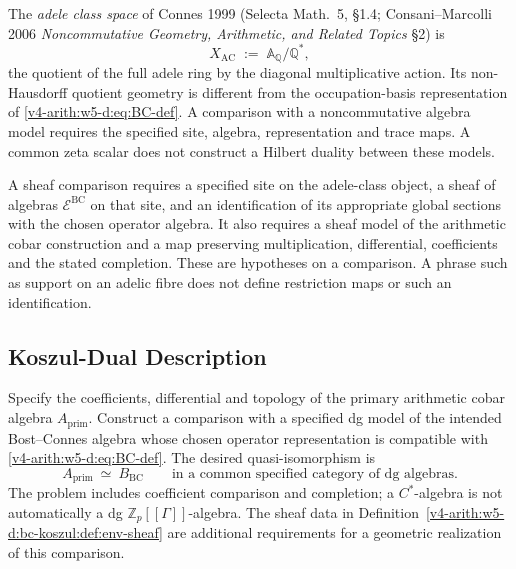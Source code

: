 The \emph{adele class space} of Connes 1999 (Selecta Math.~5,
\S1.4; Consani--Marcolli 2006 \emph{Noncommutative Geometry, Arithmetic,
and Related Topics} \S2) is
\begin{equation}
\label{v4-arith:w5-d:eq:adele-class-def}
X_{\mathrm{AC}}\;:=\;\mathbb{A}_{\mathbb{Q}}/\mathbb{Q}^{\ast},
\end{equation}
the quotient of the full adele ring by the diagonal multiplicative
action. Its non-Hausdorff quotient geometry is different from the
occupation-basis representation of \eqref{v4-arith:w5-d:eq:BC-def}.
A comparison with a noncommutative algebra model requires the specified
site, algebra, representation and trace maps. A common zeta scalar
does not construct a Hilbert duality between these models.

\begin{definition}
\label{v4-arith:w5-d:bc-koszul:def:env-sheaf}
A sheaf comparison requires a specified site on the adele-class object,
a sheaf of algebras \(\mathcal E^{\mathrm{BC}}\) on that site, and an
identification of its appropriate global sections with the chosen
operator algebra. It also requires a sheaf model of the arithmetic
cobar construction and a map preserving multiplication, differential,
coefficients and the stated completion. These are hypotheses on a
comparison. A phrase such as support on an adelic fibre does not define
restriction maps or such an identification.
\end{definition}

\subsection{Koszul-Dual Description}
\label{v4-arith:w5-d:bc-koszul:koszul-dual}

\begin{question}
\label{v4-arith:w5-d:bc-koszul:thm:main}
Specify the coefficients, differential and topology of the primary
arithmetic cobar algebra \(A_{\mathrm{prim}}\). Construct a comparison
with a specified dg model of the intended Bost--Connes algebra whose
chosen operator representation is compatible with
\eqref{v4-arith:w5-d:eq:BC-def}. The desired quasi-isomorphism is
\begin{equation}
\label{v4-arith:w5-d:eq:BC-koszul-dual}
 A_{\mathrm{prim}}\ \simeq\ B_{\mathrm{BC}}
 \qquad\text{in a common specified category of dg algebras}.
\end{equation}
The problem includes coefficient comparison and completion; a
\(C^*\)-algebra is not automatically a dg \(\mathbb Z_p[[\Gamma]]\)-algebra.
The sheaf data in
Definition~\ref{v4-arith:w5-d:bc-koszul:def:env-sheaf} are additional requirements
for a geometric realization of this comparison.
\end{question}

